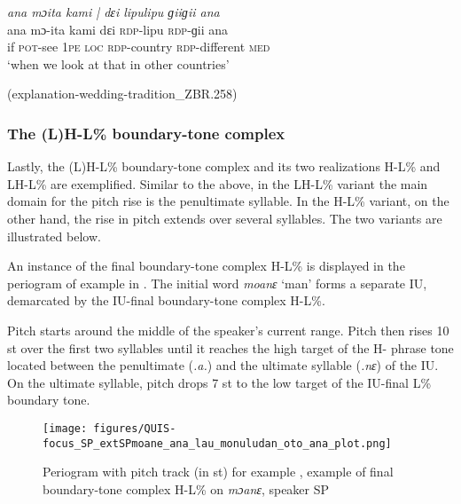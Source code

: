 \ea
\label{ex:ana moita kami dɛi lipulipu giigii ana}
\textit{ana mɔita kami | dɛi lipulipu ɡiiɡii ana} \\
\gll ana mɔ-ita kami dɛi \textsc{rdp}-lipu \textsc{rdp}-ɡii ana \\
if \textsc{pot}-see 1\textsc{pe} \textsc{loc} \textsc{rdp}-country \textsc{rdp}-different \textsc{med}\\ 
\glt ‘when we look at that in other countries’ \begin{flushright}(explanation-wedding-tradition\_ZBR.258)
	\end{flushright}
\z



\subsubsection{The (L)H-L\% boundary-tone complex}
Lastly, the (L)H-L\% boundary-tone complex and its two realizations H-L\% and LH-L\% are exemplified. Similar to the above, in the LH-L\% variant the main domain for the pitch rise is the penultimate syllable. In the H-L\% variant, on the other hand, the rise in pitch extends over several syllables. The two variants are illustrated below.

An instance of the final boundary-tone complex H-L\% is displayed in the periogram of example   in   . The initial word \textit{moanɛ} ‘man’ forms a separate IU, demarcated by the IU-final boundary-tone complex H-L\%.

Pitch starts around the middle of the speaker’s current range. Pitch then rises 10 st over the first two syllables until it reaches the high target of the H- phrase tone located between the penultimate (\textit{.a.}) and the ultimate syllable (\textit{.nɛ}) of the IU. On the ultimate syllable, pitch drops 7 st to the low target of the IU-final L\% boundary tone.






\begin{figure}
	\texttt{[image: figures/QUIS-focus\_SP\_extSPmoane\_ana\_lau\_monuludan\_oto\_ana\_plot.png]}
	\caption{Periogram with pitch track (in st) for example , example of final boundary-tone complex H-L\% on \textit{mɔanɛ}, speaker SP}
	\label{pitch:moane ana lau monuludan oto ana}
\end{figure}


